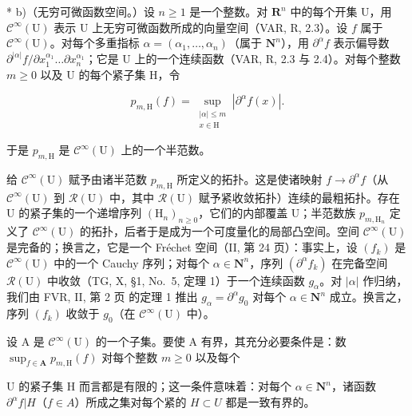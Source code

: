* b)（无穷可微函数空间。）设 \(n \geqslant 1\) 是一个整数。对 \(\mathbf{R}^n\) 中的每个开集 U，用 \(\mathcal{C}^\infty(\mathrm{U})\) 表示 U 上无穷可微函数所成的向量空间（VAR, R, 2.3）。设 \(f\) 属于 \(\mathcal{C}^\infty(\mathrm{U})\)。对每个多重指标 \(\alpha = (\alpha_1, \dots, \alpha_n)\)（属于 \(\mathbf{N}^n\)），用 \(\partial^\alpha f\) 表示偏导数 \(\partial^{|\alpha|} f / \partial x_1^{\alpha_1} \dots \partial x_n^{\alpha_1}\)；它是 U 上的一个连续函数（VAR, R, 2.3 与 2.4）。对每个整数 \(m \geqslant 0\) 以及 U 的每个紧子集 H，令

\[
p_{m,\mathrm{H}}(f) = \sup_{\substack{|\alpha |\leqslant m\\ x\in \mathrm{H}}}\left|\partial^{\alpha}f(x)\right|.\tag{1}
\]

于是 \(p_{m,\mathrm{H}}\) 是 \(\mathcal{C}^{\infty}(\mathrm{U})\) 上的一个半范数。

给 \(\mathcal{C}^{\infty}(\mathrm{U})\) 赋予由诸半范数 \(p_{m,\mathrm{H}}\) 所定义的拓扑。这是使诸映射 \(f\to \partial^{\alpha}f\)（从 \(\mathcal{C}^{\infty}(\mathrm{U})\) 到 \(\mathcal{R}(\mathrm{U})\) 中，其中 \(\mathcal{R}(\mathrm{U})\) 赋予紧收敛拓扑）连续的最粗拓扑。存在 U 的紧子集的一个递增序列 \((\mathrm{H}_n)_{n\geqslant 0}\)，它们的内部覆盖 U；半范数族 \(p_{m,\mathrm{H}_n}\) 定义了 \(\mathcal{C}^{\infty}(\mathrm{U})\) 的拓扑，后者于是成为一个可度量化的局部凸空间。空间 \(\mathcal{C}^{\infty}(\mathrm{U})\) 是完备的；换言之，它是一个 Fréchet 空间（II, 第 24 页）：事实上，设 \((f_k)\) 是 \(\mathcal{C}^{\infty}(\mathrm{U})\) 中的一个 Cauchy 序列；对每个 \(\alpha \in \mathbf{N}^n\)，序列 \((\partial^{\alpha}f_k)\) 在完备空间 \(\mathcal{R}(\mathrm{U})\) 中收敛（TG, X, §1, No.~5, 定理 1）于一个连续函数 \(g_{\alpha}\)。对 \(|\alpha|\) 作归纳，我们由 FVR, II, 第 2 页 的定理 1 推出 \(g_{\alpha} = \partial^{\alpha}g_{0}\) 对每个 \(\alpha \in \mathbf{N}^n\) 成立。换言之，序列 \((f_k)\) 收敛于 \(g_0\)（在 \(\mathcal{C}^{\infty}(\mathrm{U})\) 中）。

设 A 是 \(\mathcal{C}^{\infty}(\mathrm{U})\) 的一个子集。要使 A 有界，其充分必要条件是：数 \(\sup_{f\in \mathbf{A}}p_{m,\mathrm{H}}(f)\) 对每个整数 \(m\geqslant 0\) 以及每个

  U 的紧子集 H 而言都是有限的；这一条件意味着：对每个 \(\alpha\in \mathbf{N}^{n}\)，诸函数 \(\partial^{\alpha}f|H\)（\(f\in A\)）所成之集对每个紧的 \(H\subset U\) 都是一致有界的。

